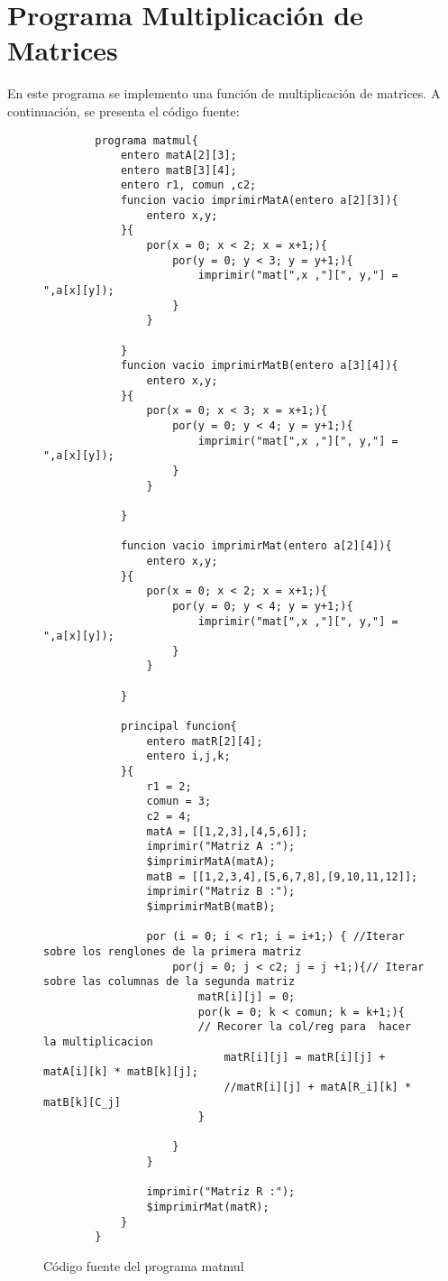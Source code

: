 \section{Programa Multiplicación de Matrices}
En este programa se implemento una función de multiplicación de matrices.
A continuación, se presenta el código fuente:
\begin{figure}[htbp]
    \centering
    \tiny
    \begin{lstlisting}
        programa matmul{
            entero matA[2][3];
            entero matB[3][4];
            entero r1, comun ,c2;
            funcion vacio imprimirMatA(entero a[2][3]){
                entero x,y;
            }{
                por(x = 0; x < 2; x = x+1;){
                    por(y = 0; y < 3; y = y+1;){
                        imprimir("mat[",x ,"][", y,"] = ",a[x][y]);
                    }
                }
                
            }
            funcion vacio imprimirMatB(entero a[3][4]){
                entero x,y;
            }{
                por(x = 0; x < 3; x = x+1;){
                    por(y = 0; y < 4; y = y+1;){
                        imprimir("mat[",x ,"][", y,"] = ",a[x][y]);
                    }
                }
                
            }
        
            funcion vacio imprimirMat(entero a[2][4]){
                entero x,y;
            }{
                por(x = 0; x < 2; x = x+1;){
                    por(y = 0; y < 4; y = y+1;){
                        imprimir("mat[",x ,"][", y,"] = ",a[x][y]);
                    }
                }
                
            }
        
            principal funcion{
                entero matR[2][4];
                entero i,j,k;
            }{
                r1 = 2;
                comun = 3;
                c2 = 4;
                matA = [[1,2,3],[4,5,6]];
                imprimir("Matriz A :");
                $imprimirMatA(matA);
                matB = [[1,2,3,4],[5,6,7,8],[9,10,11,12]];
                imprimir("Matriz B :");
                $imprimirMatB(matB);
                
                por (i = 0; i < r1; i = i+1;) { //Iterar sobre los renglones de la primera matriz
                    por(j = 0; j < c2; j = j +1;){// Iterar sobre las columnas de la segunda matriz
                        matR[i][j] = 0;
                        por(k = 0; k < comun; k = k+1;){ 
                        // Recorer la col/reg para  hacer la multiplicacion
                            matR[i][j] = matR[i][j] + matA[i][k] * matB[k][j]; 
                            //matR[i][j] + matA[R_i][k] * matB[k][C_j]
                        }
                         
                    }
                }
        
                imprimir("Matriz R :");
                $imprimirMat(matR);
            }
        }
    \end{lstlisting}
    \caption{Código fuente del programa matmul}
    \label{fig:my_label}
\end{figure}
